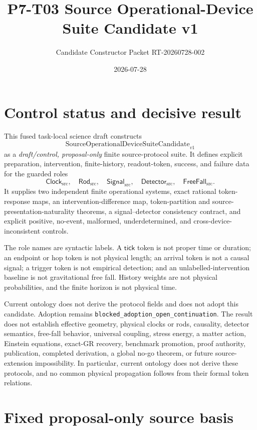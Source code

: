 \documentclass[11pt]{article}
\title{P7-T03 Source Operational-Device Suite Candidate v1}
\author{Candidate Constructor Packet RT-20260728-002}
\date{2026-07-28}
\begin{document}
\maketitle

\section{Control status and decisive result}

This fused task-local science draft constructs
\[
  \mathrm{SourceOperationalDeviceSuiteCandidate}_{v1}
\]
as a \emph{draft/control, proposal-only} finite source-protocol suite. It
defines explicit preparation, intervention, finite-history, readout-token,
success, and failure data for the guarded roles
\[
  \mathsf{Clock}_{\mathrm{src}},\quad
  \mathsf{Rod}_{\mathrm{src}},\quad
  \mathsf{Signal}_{\mathrm{src}},\quad
  \mathsf{Detector}_{\mathrm{src}},\quad
  \mathsf{FreeFall}_{\mathrm{src}}.
\]
It supplies two independent finite operational systems, exact rational
token-response maps, an intervention-difference map, token-partition and
source-presentation-naturality theorems, a signal--detector consistency
contract, and explicit positive, no-event, malformed, underdetermined, and
cross-device-inconsistent controls.

The role names are syntactic labels. A \(\mathsf{tick}\) token is not proper
time or duration; an endpoint or hop token is not physical length; an arrival
token is not a causal signal; a trigger token is not empirical detection; and
an unlabelled-intervention baseline is not gravitational free fall. History
weights are not physical probabilities, and the finite horizon is not
physical time.

Current ontology does not derive the protocol fields and does not adopt this
candidate. Adoption remains
\texttt{blocked\_adoption\_open\_continuation}. The result does not establish
effective geometry, physical clocks or rods, causality, detector semantics,
free-fall behavior, universal coupling, stress energy, a matter action,
Einstein equations, exact-GR recovery, benchmark promotion, proof authority,
publication, completed derivation, a global no-go theorem, or future
source-extension impossibility.
In particular, current ontology does not derive these protocols, and no
common physical propagation follows from their formal token relations.

\section{Fixed proposal-only source basis}
\end{document}
